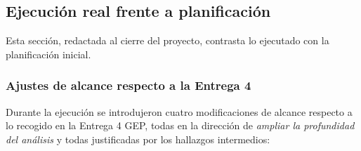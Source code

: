 \subsection{Ejecución real frente a planificación}
\label{sec:gep-ejecucion-real}

Esta sección, redactada al cierre del proyecto, contrasta lo
ejecutado con la planificación inicial.

\subsubsection{Ajustes de alcance respecto a la Entrega 4}

Durante la ejecución se introdujeron cuatro modificaciones de alcance
respecto a lo recogido en la Entrega 4 GEP, todas en la dirección de
\emph{ampliar la profundidad del análisis} y todas justificadas por los
hallazgos intermedios:

